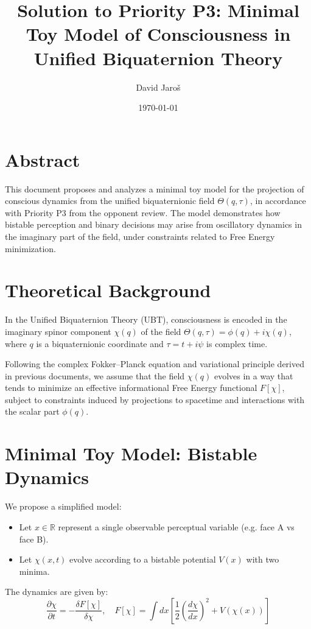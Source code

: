 \documentclass[12pt]{article}
\title{Solution to Priority P3: Minimal Toy Model of Consciousness in Unified Biquaternion Theory}
\author{David Jaroš}
\date{\today}
\begin{document}
\maketitle

\section*{Abstract}
This document proposes and analyzes a minimal toy model for the projection of conscious dynamics from the unified biquaternionic field \(\Theta(q, \tau)\), in accordance with Priority P3 from the opponent review. The model demonstrates how bistable perception and binary decisions may arise from oscillatory dynamics in the imaginary part of the field, under constraints related to Free Energy minimization.

\section{Theoretical Background}
In the Unified Biquaternion Theory (UBT), consciousness is encoded in the imaginary spinor component \(\chi(q)\) of the field \(\Theta(q, \tau) = \phi(q) + i \chi(q)\), where \(q\) is a biquaternionic coordinate and \(\tau = t + i \psi\) is complex time.

Following the complex Fokker–Planck equation and variational principle derived in previous documents, we assume that the field \(\chi(q)\) evolves in a way that tends to minimize an effective informational Free Energy functional \(F[\chi]\), subject to constraints induced by projections to spacetime and interactions with the scalar part \(\phi(q)\).

\section{Minimal Toy Model: Bistable Dynamics}
We propose a simplified model:
\begin{itemize}
    \item Let \(x \in \mathbb{R}\) represent a single observable perceptual variable (e.g. face A vs face B).
    \item Let \(\chi(x,t)\) evolve according to a bistable potential \(V(x)\) with two minima.
\end{itemize}

The dynamics are given by:
\[
\frac{\partial \chi}{\partial t} = -\frac{\delta F[\chi]}{\delta \chi}, \quad
F[\chi] = \int dx \left[ \frac{1}{2} \left( \frac{d\chi}{dx} \right)^2 + V(\chi(x)) \right]
\]
\end{document}
